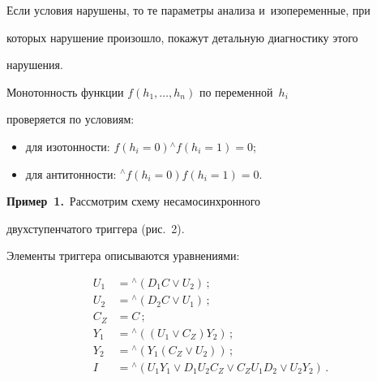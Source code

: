    Если условия нарушены, то те параметры анализа и~изопеременные, при 


которых нарушение произошло, покажут детальную диагностику этого 


нарушения.


   


   Монотонность функции $f (h_1, \ldots, h_n)$ по переменной~$h_i$ 


проверяется по условиям:


   \begin{itemize}


   \item для изотонности: $f (h_i = 0) {}^{\wedge}f (h_i = 1) = 0$;


   \item для антитонности: ${}^{\wedge}f (h_i = 0) f (h_i = 1) = 0$.


   \end{itemize}


   


   \noindent


   \textbf{Пример~1.}\ Рассмотрим схему несамосинхронного 


двухступенчатого триггера (рис.~2).


   


   Элементы триггера описываются уравнениями:


   \begin{align*}


   U_1& = {}^{\wedge} (D_1 C \vee  U_2)\,;\\


   U_2& = {}^{\wedge} (D_2 C \vee  U_1)\,;\\


   C_Z& = C\,;\\


   Y_1& = {}^{\wedge} ((U_1 \vee C_Z) Y_2)\,;\\


   Y_2& = {}^{\wedge} (Y_1 (C_Z \vee U_2))\,;\\


   I &= {}^{\wedge}(U_1 Y_1 \vee D_1 U_2 C_Z \vee C_Z U_1 D_2 \vee U_2 Y_2)\,.


   \end{align*}


   


